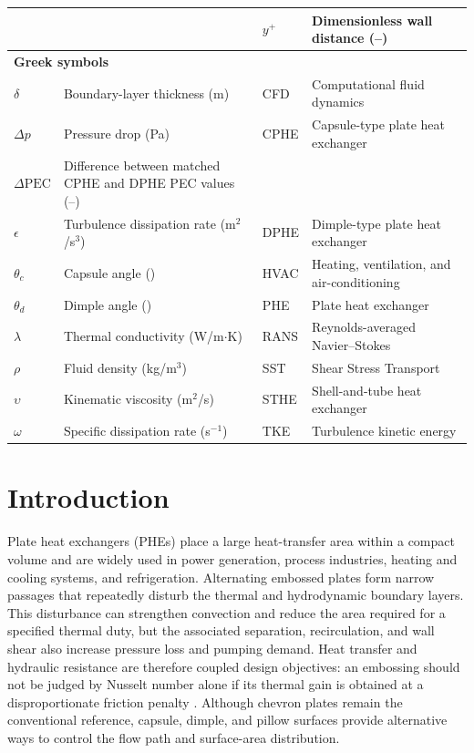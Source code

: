 \documentclass[energies,article,submit,moreauthors,noheaderline]{Definitions/mdpi}
\newcommand{\degree}{\texorpdfstring{\ensuremath{^\circ}}{\textdegree}}
\def\ensuremath#1{}%
\def\degree{\textdegree}%
\def\quad{ }%
\begin{document}
\begin{table}[H]
\begin{tabularx}{\textwidth}{@{}l>{\raggedright\arraybackslash}X@{\quad}l>{\raggedright\arraybackslash}X@{}}
            &                       & $y^+$       & Dimensionless wall distance (--) \\
\hline
\multicolumn{2}{l}{\textbf{Greek symbols}} & \multicolumn{2}{l}{\textbf{Abbreviations}} \\
\hline
$\delta$    & Boundary-layer thickness (m) & CFD   & Computational fluid dynamics \\
$\Delta p$  & Pressure drop (Pa) & CPHE  & Capsule-type plate heat exchanger \\
$\Delta\mathrm{PEC}$ & Difference between matched CPHE and DPHE PEC values (--) & & \\
$\epsilon$  & Turbulence dissipation rate (m$^2$/s$^3$) & DPHE  & Dimple-type plate heat exchanger \\
$\theta_c$  & Capsule angle (\degree) & HVAC  & Heating, ventilation, and air-conditioning \\
$\theta_d$  & Dimple angle (\degree) & PHE   & Plate heat exchanger \\
$\lambda$   & Thermal conductivity (W/m$\cdot$K) & RANS  & Reynolds-averaged Navier--Stokes \\
$\rho$      & Fluid density (kg/m$^3$) & SST   & Shear Stress Transport \\
$\upsilon$  & Kinematic viscosity (m$^2$/s) & STHE  & Shell-and-tube heat exchanger \\
$\omega$    & Specific dissipation rate (s$^{-1}$) & TKE   & Turbulence kinetic energy \\          
\hline
\end{tabularx}
\end{table}


\section{Introduction}
\label{sec:introduction} 


Plate heat exchangers (PHEs) place a large heat-transfer area within a compact volume and are widely used in power generation, process industries, heating and cooling systems, and refrigeration. Alternating embossed plates form narrow passages that repeatedly disturb the thermal and hydrodynamic boundary layers. This disturbance can strengthen convection and reduce the area required for a specified thermal duty, but the associated separation, recirculation, and wall shear also increase pressure loss and pumping demand. Heat transfer and hydraulic resistance are therefore coupled design objectives: an embossing should not be judged by Nusselt number alone if its thermal gain is obtained at a disproportionate friction penalty \citep{abukhader2012, thulukkanam2013, zhang2019a}. Although chevron plates remain the conventional reference, capsule, dimple, and pillow surfaces provide alternative ways to control the flow path and surface-area distribution.
\end{document}

